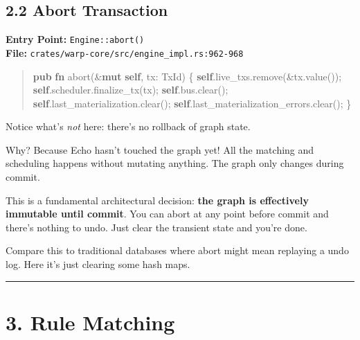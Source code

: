 \documentclass[11pt]{book}
\newenvironment{Shaded}{\begin{quote}}{\end{quote}}
\newcommand{\KeywordTok}[1]{\textcolor[rgb]{0.00,0.44,0.13}{\textbf{#1}}}
\newcommand{\NormalTok}[1]{#1}
\newcommand{\OperatorTok}[1]{\textcolor[rgb]{0.40,0.40,0.40}{#1}}
\newenvironment{directors}
{\begin{mdframed}[
  linecolor=blue!60,
  linewidth=2pt,
  leftline=true,
  rightline=false,
  topline=false,
  bottomline=false,
  backgroundcolor=blue!3,
  innerleftmargin=12pt,
  innerrightmargin=10pt,
  innertopmargin=8pt,
  innerbottommargin=8pt,
  skipabove=12pt,
  skipbelow=12pt
]\small\sffamily\color{blue!70!black}}
{\end{mdframed}}
\begin{document}
\subsection{2.2 Abort Transaction}

\textbf{Entry Point:} \texttt{Engine::abort()} \\
\textbf{File:} \texttt{crates/warp-core/src/engine\_impl.rs:962-968}

\begin{Shaded}
\begin{Highlighting}[]
\KeywordTok{pub} \KeywordTok{fn}\NormalTok{ abort(}\OperatorTok{\&}\KeywordTok{mut} \KeywordTok{self}\OperatorTok{,}\NormalTok{ tx}\OperatorTok{:}\NormalTok{ TxId) }\OperatorTok{\{}
    \KeywordTok{self}\OperatorTok{.}\NormalTok{live\_txs}\OperatorTok{.}\NormalTok{remove(}\OperatorTok{\&}\NormalTok{tx}\OperatorTok{.}\NormalTok{value())}\OperatorTok{;}
    \KeywordTok{self}\OperatorTok{.}\NormalTok{scheduler}\OperatorTok{.}\NormalTok{finalize\_tx(tx)}\OperatorTok{;}
    \KeywordTok{self}\OperatorTok{.}\NormalTok{bus}\OperatorTok{.}\NormalTok{clear()}\OperatorTok{;}
    \KeywordTok{self}\OperatorTok{.}\NormalTok{last\_materialization}\OperatorTok{.}\NormalTok{clear()}\OperatorTok{;}
    \KeywordTok{self}\OperatorTok{.}\NormalTok{last\_materialization\_errors}\OperatorTok{.}\NormalTok{clear()}\OperatorTok{;}
\OperatorTok{\}}
\end{Highlighting}
\end{Shaded}

\begin{directors}
Notice what's \emph{not} here: there's no rollback of graph state.

Why? Because Echo hasn't touched the graph yet! All the matching and scheduling happens without mutating anything. The graph only changes during commit.

This is a fundamental architectural decision: \textbf{the graph is effectively immutable until commit}. You can abort at any point before commit and there's nothing to undo. Just clear the transient state and you're done.

Compare this to traditional databases where abort might mean replaying a undo log. Here it's just clearing some hash maps.
\end{directors}

\begin{center}\rule{0.5\linewidth}{0.5pt}\end{center}

\section{3. Rule Matching}\label{rule-matching}
\end{document}
